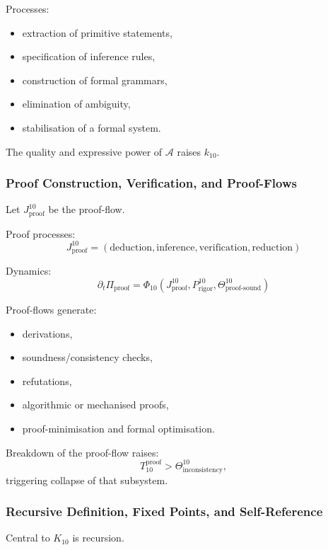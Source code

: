 Processes:
\begin{itemize}
    \item extraction of primitive statements,
    \item specification of inference rules,
    \item construction of formal grammars,
    \item elimination of ambiguity,
    \item stabilisation of a formal system.
\end{itemize}

The quality and expressive power of $\mathcal{A}$ raises $k_{10}$.

\subsubsection{Proof Construction, Verification, and Proof-Flows}

Let $J^{10}_{\text{proof}}$ be the proof-flow.

Proof processes:
\[
J^{10}_{\text{proof}} = 
(\text{deduction}, \text{inference}, \text{verification}, \text{reduction})
\]

Dynamics:
\[
\partial_t \Pi_{\text{proof}} 
= \Phi_{10}(J^{10}_{\text{proof}}, 
            P^{10}_{\text{rigor}}, 
            \Theta^{10}_{\text{proof-sound}})
\]

Proof-flows generate:
\begin{itemize}
    \item derivations,
    \item soundness/consistency checks,
    \item refutations,
    \item algorithmic or mechanised proofs,
    \item proof-minimisation and formal optimisation.
\end{itemize}

Breakdown of the proof-flow raises:
\[
T_{10}^{\text{proof}} > \Theta^{10}_{\text{inconsistency}},
\]
triggering collapse of that subsystem.

\subsubsection{Recursive Definition, Fixed Points, and Self-Reference}

Central to $K_{10}$ is recursion.


